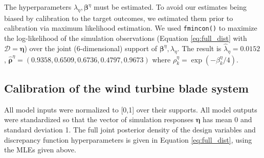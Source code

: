 \documentclass[12pt]{article}
\begin{document}
The hyperparameters $\lambda_\eta,\boldsymbol \beta^\eta$ must be estimated.
% 
To avoid our estimates being biased by calibration to the target outcomes, we estimated them prior to calibration via maximum likelihood estimation.
% 
%
We used \texttt{fmincon()} \citep{MATLAB2017} %
to maximize the log-likelihood of the simulation observations  (Equation \eqref{eq:full_dist} with $\mathcal D=\boldsymbol\eta$) over the joint (6-dimensional) support of $\boldsymbol \beta^\eta,\lambda_\eta$.  
%
The result is $\hat\lambda_\eta = 0.0152$, $\boldsymbol {\hat\rho}^\eta = (0.9358, 0.6509, 0.6736, 0.4797, 0.9673)$
where $\rho^\eta_k = \exp(-\beta_k^\eta/4)$. 

\subsection{Calibration of the wind turbine blade system}\label{the_model}
%
All model inputs were normalized to [0,1] over their supports. 
%
All model outputs were standardized so that the vector of simulation responses $\boldsymbol\eta$ has mean 0 and standard deviation 1.
%
The full joint posterior density of the design variables and discrepancy function hyperparameters is given in Equation \eqref{eq:full_dist}, using the MLEs given above.
%
\end{document}
